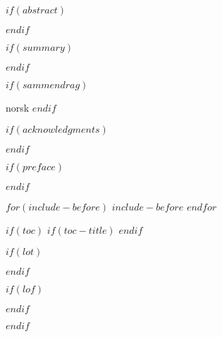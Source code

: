 \documentclass[11pt,twoside,openright,titlepage,
  headinclude,footinclude,BCOR=5mm,
  numbers=noenddot,cleardoublepage=empty,
  tablecaptionabove, dottedtoc,
  bibliography=totoc]{scrreprt}
\begin{document}
$if(abstract)$
\cleardoublepage
{}

$endif$

\begingroup
$if(summary)$

$endif$

$if(sammendrag)$
\begin{otherlanguage}{norsk}

\end{otherlanguage}{norsk}
$endif$
\endgroup

$if(acknowledgments)$
\begingroup
\cleardoublepage
{}

\endgroup
$endif$

$if(preface)$
\begingroup
\cleardoublepage
{}

\endgroup
$endif$

$for(include-before)$
$include-before$
$endfor$

$if(toc)$
\cleardoublepage
{}
{}
\setcounter{tocdepth}{$if(tocdepth)$$tocdepth$$else$2$endif$}
\begingroup 
  \let\clearpage\relax
  \let\cleardoublepage\relax
  $if(toc-title)$
  \renewcommand*\contentsname{$toc-title$}
  $endif$
  \tableofcontents
\endgroup
\markboth{\spacedlowsmallcaps{\contentsname}}
{\spacedlowsmallcaps{\contentsname}} 

\begingroup
$if(lot)$
\cleardoublepage
\listoftables
\vfill
\let\clearpage\relax
\let\cleardoublepage\relax
$endif$

$if(lof)$
\listoffigures
\vfill
$endif$
\endgroup

\begingroup 
  \let\clearpage\relax
  \let\cleardoublepage\relax
\endgroup
$endif$  
\end{document}
